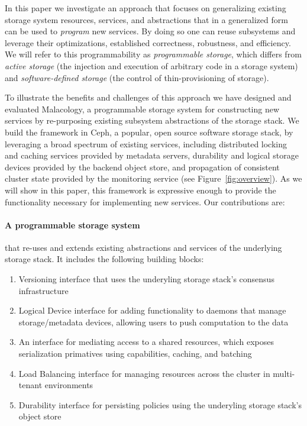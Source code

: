 \documentclass[preprint]{sigplanconf-eurosys}
\begin{document}
In this paper we investigate an approach that focuses on generalizing existing
storage system resources, services, and abstractions that in a generalized form
can be used to \emph{program} new services. By doing so one can reuse
subsystems and leverage their optimizations, established correctness,
robustness, and efficiency. We will refer to this programmability as
\emph{programmable storage}, which differs from \emph{active storage} (the
injection and execution of arbitrary code in a storage system) and
\emph{software-defined storage} (the control of thin-provisioning of storage).

To illustrate the benefits and challenges of this approach we have designed and
evaluated Malacology, a programmable storage system for constructing new
services by re-purposing existing subsystem abstractions of the storage stack.
We build the framework in Ceph, a popular, open source software storage stack,
by leveraging a broad spectrum of existing services, including distributed
locking and caching services provided by metadata servers, durability and
logical storage devices provided by the backend object store, and propagation
of consistent cluster state provided by the monitoring service (see
Figure~\ref{fig:overview}). As we will show in this paper, this framework is
expressive enough to provide the functionality necessary for implementing new
services. Our contributions are:

\paragraph*{A programmable storage system} that re-uses and extends existing
abstractions and services of the underlying storage stack. It
includes the following building blocks:

\begin{enumerate}

\item Versioning interface that uses the underyling storage stack's consensus
infrastructure 

\item Logical Device interface for adding functionality to daemons that manage
storage/metadata devices, allowing users to push computation to the data

\item An interface for mediating access to a shared resources, which exposes
serialization primatives using capabilities, caching, and batching

\item Load Balancing interface for managing resources across the cluster in
multi-tenant environments

\item Durability interface for persisting policies using the underyling storage
stack's object store

\end{enumerate}
\end{document}
